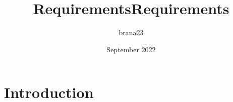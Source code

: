 \documentclass{article}
\title{Requirements}
\author{brana23 }
\date{September 2022}
\begin{document}
\title{Requirements}

\section{Introduction}
\end{document}
